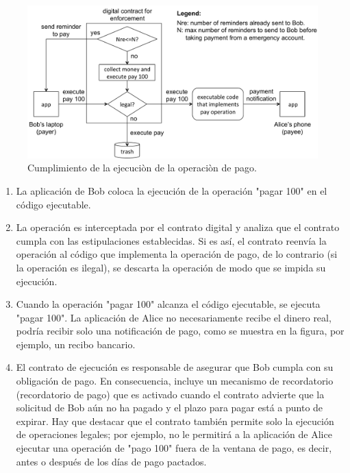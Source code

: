 \documentclass[12pt]{report} %
\begin{document}
\begin{figure}
\centering
\includegraphics[width=0.75\columnwidth]{figures/exepayenforce.pdf}
\caption{Cumplimiento de la ejecuciòn de la operaciòn de pago.}
\label{fig:exepayenforce}
\end{figure}


\begin{enumerate}
    \item La aplicación de Bob coloca la ejecución de la operación "pagar 100" en el código ejecutable.

    \item La operación es interceptada por el contrato digital y analiza que el contrato cumpla con las estipulaciones establecidas. Si es así, el contrato reenvía la operación al código que implementa la operación de pago, de lo contrario (si la operación es ilegal), se descarta la operación de modo que se impida su ejecución.

    \item Cuando la operación "pagar 100" alcanza el código ejecutable, se ejecuta "pagar 100". La aplicación de Alice no necesariamente recibe el dinero real, podría recibir solo una notificación de pago, como se muestra en la figura, por ejemplo, un recibo bancario.

    \item El contrato de ejecución es responsable de asegurar que Bob cumpla con su obligación de pago. En consecuencia, incluye un mecanismo de recordatorio (recordatorio de pago) que es activado cuando el contrato advierte que la solicitud de Bob aún no ha pagado y el plazo para pagar está a punto de expirar. Hay que destacar que el contrato también permite solo la ejecución  de operaciones legales; por ejemplo, no le permitirá a la aplicación de Alice ejecutar una operación de "pago 100" fuera de la ventana de pago, es decir, antes o después de los días de pago pactados.

    \end{enumerate}
\end{document}
